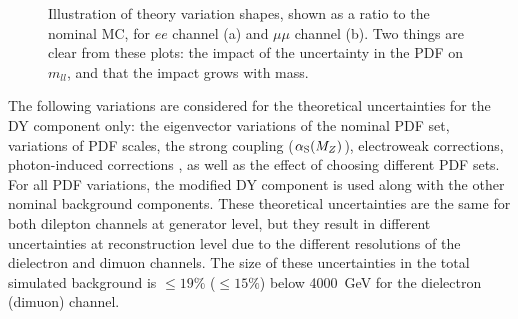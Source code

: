\begin{figure}[htp]
\centering
{}
\caption{Illustration of theory variation shapes, shown as a ratio to the nominal MC, for $ee$ channel (a) and $\mu\mu$ channel (b). Two things are clear from these plots: the impact of the uncertainty in the PDF on $m_{ll}$, and that the impact grows with mass.}
\label{fig:ciThyVar}
\end{figure}

The following variations are considered for the theoretical uncertainties for the DY component only: the eigenvector variations of the nominal PDF set, variations of PDF scales, the strong coupling ($\alpha_{\textrm S}(M_Z)$), electroweak corrections, photon-induced corrections \cite{Martin:2005pi}, as well as the effect of choosing different PDF sets.
For all PDF variations, the modified DY component is used along with the other nominal background components.
These theoretical uncertainties are the same for both dilepton channels at generator level, but they result in different uncertainties at reconstruction level due to the different resolutions of the dielectron and dimuon channels.
The size of these uncertainties in the total simulated background is $\leq 19\%$ ($\leq 15\%$) below 4000~GeV for the dielectron (dimuon) channel.

